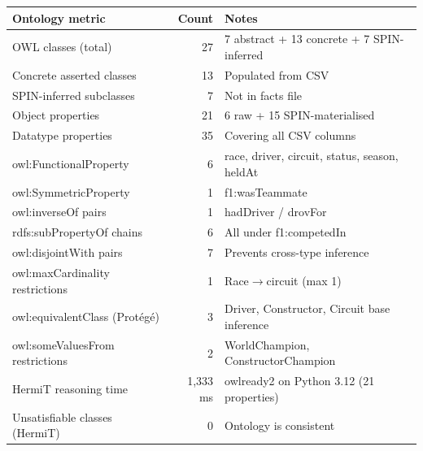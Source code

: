 
\begin{center}
\begin{tabular}{@{}lrl@{}}
\toprule
\textbf{Ontology metric} & \textbf{Count} & \textbf{Notes} \\
\midrule
OWL classes (total)          & 27  & 7 abstract + 13 concrete + 7 SPIN-inferred \\
Concrete asserted classes    & 13  & Populated from CSV \\
SPIN-inferred subclasses     & 7   & Not in facts file \\
Object properties            & 21  & 6 raw + 15 SPIN-materialised \\
Datatype properties          & 35  & Covering all CSV columns \\
owl:FunctionalProperty       & 6   & race, driver, circuit, status, season, heldAt \\
owl:SymmetricProperty        & 1   & f1:wasTeammate \\
owl:inverseOf pairs          & 1   & hadDriver / drovFor \\
rdfs:subPropertyOf chains    & 6   & All under f1:competedIn \\
owl:disjointWith pairs       & 7   & Prevents cross-type inference \\
owl:maxCardinality restrictions & 1 & Race$\to$circuit (max 1) \\
owl:equivalentClass (Protégé)& 3   & Driver, Constructor, Circuit base inference \\
owl:someValuesFrom restrictions & 2 & WorldChampion, ConstructorChampion \\
HermiT reasoning time        & 1{,}333 ms & owlready2 on Python 3.12 (21 properties) \\
Unsatisfiable classes (HermiT) & 0 & Ontology is consistent \\
\bottomrule
\end{tabular}
\end{center}

\vspace{0.8em}

